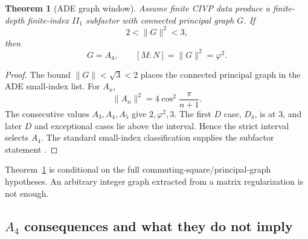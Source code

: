 \documentclass[aps,prd,preprint,nofootinbib,superscriptaddress]{revtex4-2}
\newtheorem{theorem}{Theorem}[section]
\theoremstyle{definition}
\theoremstyle{remark}
\begin{document}
\begin{theorem}[ADE graph window]
\label{thm:ade}
Assume finite CIVP data produce a finite-depth finite-index $II_1$ subfactor with connected principal graph $G$.  If
\begin{equation}
2<\|G\|^2<3,
\label{eq:graph-window}
\end{equation}
then
\begin{equation}
G=A_4,
\qquad
[M:N]=\|G\|^2=\varphi^2.
\label{eq:a4}
\end{equation}
\end{theorem}

\begin{proof}
The bound $\|G\|<\sqrt3<2$ places the connected principal graph in the ADE small-index list.  For $A_n$,
\begin{equation}
\|A_n\|^2=4\cos^2\frac{\pi}{n+1}.
\end{equation}
The consecutive values $A_3,A_4,A_5$ give $2,\varphi^2,3$.  The first $D$ case, $D_4$, is at $3$, and later $D$ and exceptional cases lie above the interval.  Hence the strict interval selects $A_4$.  The standard small-index classification supplies the subfactor statement \cite{AfzalyMorrisonPenneys2023}.
\end{proof}

Theorem~\ref{thm:ade} is conditional on the full commuting-square/principal-graph hypotheses.  An arbitrary integer graph extracted from a matrix regularization is not enough.

\subsection{$A_4$ consequences and what they do not imply}
\end{document}
